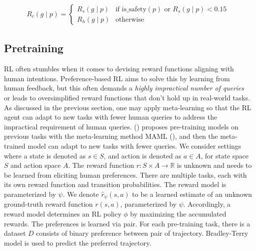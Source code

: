 \documentclass[
  letterpaper,
  numbers=noenddot,
  DIV=11]{scrreprt}
\theoremstyle{definition}
\theoremstyle{plain}
\theoremstyle{plain}
\theoremstyle{remark}
\begin{document}
\[
\begin{aligned}
    R_c(g \mid p) =
    \begin{cases}
        R_s(g \mid p) & \text{if } \text{is\_safety}(p) \text{ or } R_s(g \mid p) < 0.15 \\
        R_h(g \mid p) & \text{otherwise}
    \end{cases}
\end{aligned}
\]

\subsection{Pretraining}\label{pretraining}

RL often stumbles when it comes to devising reward functions aligning
with human intentions. Preference-based RL aims to solve this by
learning from human feedback, but this often demands a \emph{highly
impractical number of queries} or leads to oversimplified reward
functions that don't hold up in real-world tasks. As discussed in the
previous section, one may apply meta-learning so that the RL agent can
adapt to new tasks with fewer human queries to address the impractical
requirement of human queries. () proposes pre-training models on previous tasks with the
meta-learning method MAML (), and then the meta-trained model can adapt to new
tasks with fewer queries. We consider settings where a state is denoted
as \(s\in S\), and action is denoted as \(a\in A\), for state space
\(S\) and action space \(A\). The reward function
\(r: S\times A \to \mathbb{R}\) is unknown and needs to be learned from
eliciting human preferences. There are multiple tasks, each with its own
reward function and transition probabilities. The reward model is
parameterized by \(\psi\). We denote \(\hat{r}_\psi(s, a)\) to be a
learned estimate of an unknown ground-truth reward function \(r(s, a)\),
parameterized by \(\psi\). Accordingly, a reward model determines an RL
policy \(\phi\) by maximizing the accumulated rewards. The preferences
is learned via pair. For each pre-training task, there is a dataset
\(D\) consists of binary preference between pair of trajectory.
Bradley-Terry model is used to predict the preferred trajectory.
\end{document}
